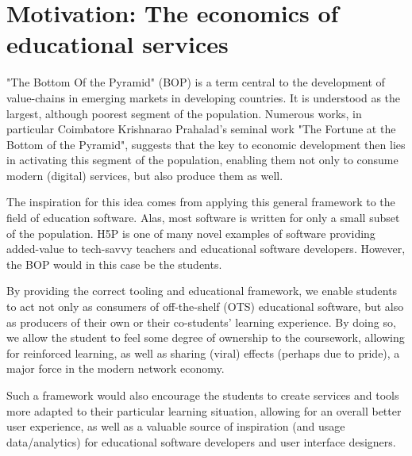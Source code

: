 \section{Motivation: The economics of educational services}

"The Bottom Of the Pyramid" (BOP) is a term central to the development of
value-chains in emerging markets in developing countries. It is understood as
the largest, although poorest segment of the population. Numerous works, in
particular Coimbatore Krishnarao Prahalad's seminal work "The Fortune at the
Bottom of the Pyramid", suggests that the key to economic development then lies
in activating this segment of the population, enabling them not only to consume
modern (digital) services, but also produce them as well.

The inspiration for this idea comes from applying this general framework to the
field of education software. Alas, most software is written for only a small
subset of the population. H5P is one of many novel examples of software
providing added-value to tech-savvy teachers and educational software
developers. However, the BOP would in this case be the students.

By providing the correct tooling and educational framework, we enable students
to act not only as consumers of off-the-shelf (OTS) educational software, but
also as producers of their own or their co-students' learning experience. By
doing so, we allow the student to feel some degree of ownership to the
coursework, allowing for reinforced learning, as well as sharing (viral) effects
(perhaps due to pride), a major force in the modern network economy.

Such a framework would also encourage the students to create services and tools
more adapted to their particular learning situation, allowing for an overall
better user experience, as well as a valuable source of inspiration (and usage
data/analytics) for educational software developers and user interface
designers.
